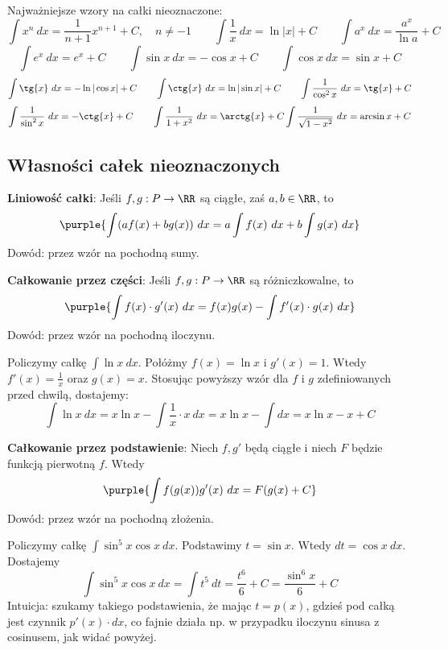 \begin{example}
    Najważniejsze wzory na całki nieoznaczone:
    $$\int x^n\ dx = \frac{1}{n+1}x^{n+1} + C, \quad n\neq -1 \qquad \int\frac{1}{x}\ dx = \ln|x| + C \qquad \int a^x\ dx = \frac{a^x}{\ln{a}} + C$$
    $$\int e^x\ dx = e^x + C \qquad \int\sin{x}\ dx = -\cos{x} + C \qquad \int\cos{x}\ dx = \sin{x} + C$$
    $$\int \tg{x}\ dx = -\ln|\cos{x}| + C \qquad \int \ctg{x}\ dx = \ln|\sin{x}| + C \qquad \int\frac{1}{\cos^2{x}}\ dx = \tg{x} + C$$
    $$\int\frac{1}{\sin^2{x}}\ dx = -\ctg{x} + C \qquad \int\frac{1}{1+x^2}\ dx = \arctg{x} + C \int\frac{1}{\sqrt{1-x^2}}\ dx = \arcsin{x} + C$$
\end{example}

\subsection{Własności całek nieoznaczonych}
\textbf{Liniowość całki}:
Jeśli $f,g:P\to\RR$ są ciągłe, zaś $a,b\in\RR$, to
$$\purple{\int(af(x)+bg(x))\ dx = a\int f(x)\ dx + b\int g(x)\ dx}$$
Dowód: przez wzór na pochodną sumy.

\textbf{Całkowanie przez części}:
Jeśli $f,g:P\to\RR$ są różniczkowalne, to
$$\purple{\int f(x)\cdot g'(x)\ dx = f(x)g(x) - \int f'(x)\cdot g(x)\ dx}$$
Dowód: przez wzór na pochodną iloczynu.

\begin{example}
    Policzymy całkę $\int\ln{x}\ dx$. Połóżmy $f(x)=\ln{x}$ i $g'(x)=1$. Wtedy $f'(x)=\frac{1}{x}$ oraz $g(x)=x$. Stosując powyższy wzór dla $f$ i $g$ zdefiniowanych przed chwilą, dostajemy:
    $$
    \int\ln{x}\ dx = x\ln{x} - \int\frac{1}{x}\cdot x\ dx = x\ln{x} - \int dx = x\ln{x} - x + C
    $$
\end{example}

\textbf{Całkowanie przez podstawienie}:
Niech $f,g'$ będą ciągłe i niech $F$ będzie funkcją pierwotną $f$. Wtedy
$$\purple{\int f(g(x))g'(x)\ dx = F(g(x) + C}$$
Dowód: przez wzór na pochodną złożenia.

\begin{example}
    Policzymy całkę $\int\sin^5{x}\cos{x}\ dx$. Podstawimy $t=\sin{x}$. Wtedy $dt=\cos{x}\ dx$. Dostajemy
    $$
    \int\sin^5{x}\cos{x}\ dx = \int t^5\ dt = \frac{t^6}{6} + C = \frac{\sin^6{x}}{6} + C
    $$
    Intuicja: szukamy takiego podstawienia, że mając $t=p(x)$, gdzieś pod całką jest czynnik $p'(x)\cdot dx$, co fajnie działa np. w przypadku iloczynu sinusa z cosinusem, jak widać powyżej.
\end{example}

